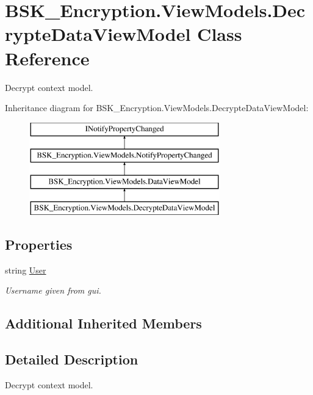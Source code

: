\hypertarget{class_b_s_k___encryption_1_1_view_models_1_1_decrypte_data_view_model}{}\section{B\+S\+K\+\_\+\+Encryption.\+View\+Models.\+Decrypte\+Data\+View\+Model Class Reference}
\label{class_b_s_k___encryption_1_1_view_models_1_1_decrypte_data_view_model}


Decrypt context model.  


Inheritance diagram for B\+S\+K\+\_\+\+Encryption.\+View\+Models.\+Decrypte\+Data\+View\+Model\+:\begin{figure}[H]
\begin{center}
\leavevmode
\includegraphics[height=4.000000cm]{class_b_s_k___encryption_1_1_view_models_1_1_decrypte_data_view_model}
\end{center}
\end{figure}
\subsection*{Properties}
\begin{DoxyCompactItemize}
\item 
string \mbox{\hyperlink{class_b_s_k___encryption_1_1_view_models_1_1_decrypte_data_view_model_ad5fdb1882096e5a0c7705c8112e7e6fa}{User}}
\begin{DoxyCompactList}\small\item\em Username given from gui. \end{DoxyCompactList}\end{DoxyCompactItemize}
\subsection*{Additional Inherited Members}


\subsection{Detailed Description}
Decrypt context model. 



